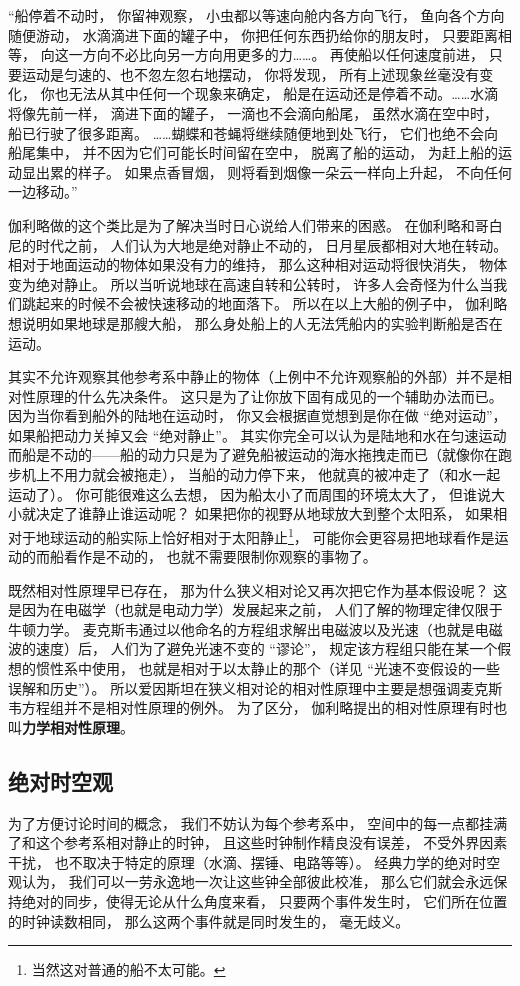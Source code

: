 “船停着不动时， 你留神观察， 小虫都以等速向舱内各方向飞行， 鱼向各个方向随便游动， 水滴滴进下面的罐子中， 你把任何东西扔给你的朋友时， 只要距离相等， 向这一方向不必比向另一方向用更多的力……。 再使船以任何速度前进， 只要运动是匀速的、也不忽左忽右地摆动， 你将发现， 所有上述现象丝毫没有变化， 你也无法从其中任何一个现象来确定， 船是在运动还是停着不动。……水滴将像先前一样， 滴进下面的罐子， 一滴也不会滴向船尾， 虽然水滴在空中时， 船已行驶了很多距离。 ……蝴蝶和苍蝇将继续随便地到处飞行， 它们也绝不会向船尾集中， 并不因为它们可能长时间留在空中， 脱离了船的运动， 为赶上船的运动显出累的样子。 如果点香冒烟， 则将看到烟像一朵云一样向上升起， 不向任何一边移动。”

伽利略做的这个类比是为了解决当时日心说给人们带来的困惑。 在伽利略和哥白尼的时代之前， 人们认为大地是绝对静止不动的， 日月星辰都相对大地在转动。 相对于地面运动的物体如果没有力的维持， 那么这种相对运动将很快消失， 物体变为绝对静止。 所以当听说地球在高速自转和公转时， 许多人会奇怪为什么当我们跳起来的时候不会被快速移动的地面落下。 所以在以上大船的例子中， 伽利略想说明如果地球是那艘大船， 那么身处船上的人无法凭船内的实验判断船是否在运动。

其实不允许观察其他参考系中静止的物体（上例中不允许观察船的外部）并不是相对性原理的什么先决条件。 这只是为了让你放下固有成见的一个辅助办法而已。 因为当你看到船外的陆地在运动时， 你又会根据直觉想到是你在做 “绝对运动”， 如果船把动力关掉又会 “绝对静止”。 其实你完全可以认为是陆地和水在匀速运动而船是不动的——船的动力只是为了避免船被运动的海水拖拽走而已（就像你在跑步机上不用力就会被拖走）， 当船的动力停下来， 他就真的被冲走了（和水一起运动了）。 你可能很难这么去想， 因为船太小了而周围的环境太大了， 但谁说大小就决定了谁静止谁运动呢？ 如果把你的视野从地球放大到整个太阳系， 如果相对于地球运动的船实际上恰好相对于太阳静止\footnote{当然这对普通的船不太可能。}， 可能你会更容易把地球看作是运动的而船看作是不动的， 也就不需要限制你观察的事物了。

既然相对性原理早已存在， 那为什么狭义相对论又再次把它作为基本假设呢？ 这是因为在电磁学（也就是电动力学）发展起来之前， 人们了解的物理定律仅限于牛顿力学。 麦克斯韦通过以他命名的方程组求解出电磁波以及光速（也就是电磁波的速度）后， 人们为了避免光速不变的 “谬论”， 规定该方程组只能在某一个假想的惯性系中使用， 也就是相对于以太静止的那个（详见 “光速不变假设的一些误解和历史”）。 所以爱因斯坦在狭义相对论的相对性原理中主要是想强调麦克斯韦方程组并不是相对性原理的例外。 为了区分， 伽利略提出的相对性原理有时也叫\textbf{力学相对性原理}。

\subsection{绝对时空观} \label{sub_Relat0_1}
为了方便讨论时间的概念， 我们不妨认为每个参考系中， 空间中的每一点都挂满了和这个参考系相对静止的时钟， 且这些时钟制作精良没有误差， 不受外界因素干扰， 也不取决于特定的原理（水滴、摆锤、电路等等）。 经典力学的绝对时空观认为， 我们可以一劳永逸地一次让这些钟全部彼此校准， 那么它们就会永远保持绝对的同步，使得无论从什么角度来看， 只要两个事件发生时， 它们所在位置的时钟读数相同， 那么这两个事件就是同时发生的， 毫无歧义。

